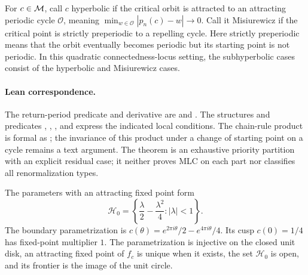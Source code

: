 \begin{definition}
For $c\in\mathcal M$, call $c$ hyperbolic if the critical orbit is attracted
to an attracting periodic cycle $\mathcal O$, meaning
$\min_{w\in\mathcal O}|p_n(c)-w|\to0$.
Call it Misiurewicz if the
critical point is strictly preperiodic to a repelling cycle.
Here strictly preperiodic means that the orbit eventually becomes
periodic but its starting point is not periodic.
In this quadratic connectedness-locus setting, the subhyperbolic
cases consist of the hyperbolic and Misiurewicz cases.
\end{definition}

\paragraph{Lean correspondence.}
The return-period predicate and derivative are
 and
.
The structures and predicates ,
, , and
 express the indicated local conditions.
The chain-rule product is formal as
;
the invariance of this product under a change of starting point on a
cycle remains a text argument.
The theorem  is an exhaustive
priority partition with an explicit residual case; it neither
proves MLC on each part nor classifies all renormalization types.

\begin{proposition}
\label{prop:main-cardioid}
The parameters with an attracting fixed point form
\[
 \mathcal H_0=
 \left\{\frac{\lambda}{2}-\frac{\lambda^2}{4}:
                         |\lambda|<1\right\}.
\]
The boundary parametrization is
$c(\theta)=e^{2\pi i\theta}/2-e^{4\pi i\theta}/4$.
Its cusp $c(0)=1/4$ has fixed-point multiplier $1$.
The parametrization is injective on the closed unit disk, an attracting
fixed point of $f_c$ is unique when it exists, the set $\mathcal H_0$ is
open, and its frontier is the image of the unit circle.
\end{proposition}

